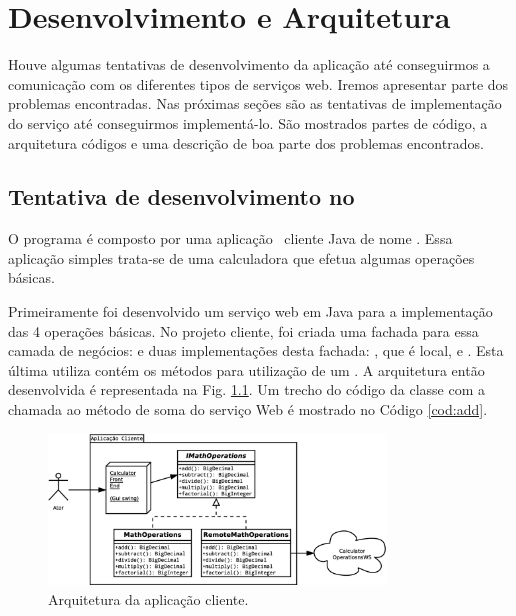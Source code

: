 %

\chapter{Desenvolvimento e Arquitetura}

Houve algumas tentativas de desenvolvimento da aplicação até conseguirmos a
comunicação com os diferentes tipos de serviços web. Iremos apresentar parte dos
problemas encontradas. Nas próximas seções são as tentativas de implementação do
serviço até conseguirmos implementá-lo. São mostrados partes de código, a
arquitetura códigos e uma descrição de boa parte dos problemas encontrados. 

\section{Tentativa de desenvolvimento no \NetBeans}

O programa é composto por uma aplicação \desktop\ cliente Java de nome
. Essa aplicação simples trata-se de uma calculadora que
efetua algumas operações básicas. 

Primeiramente foi desenvolvido um serviço web em Java para a implementação das 4
operações básicas. No projeto cliente, foi criada uma fachada para essa camada
de negócios:  e duas implementações desta fachada:
, que é local, e . Esta última
utiliza contém os métodos para utilização de um \WebService. A arquitetura então
desenvolvida é representada na Fig.  \ref{fig:arquitetura:calc}. Um trecho do
código da classe  com a chamada ao método de soma do
serviço Web é mostrado no Código \ref{cod:add}.

\begin{figure}[htb]
  \centering
  \includegraphics[width=0.8\textwidth]{imgs/calculadora}
  \caption{Arquitetura da aplicação cliente.}
  \label{fig:arquitetura:calc}
\end{figure}


